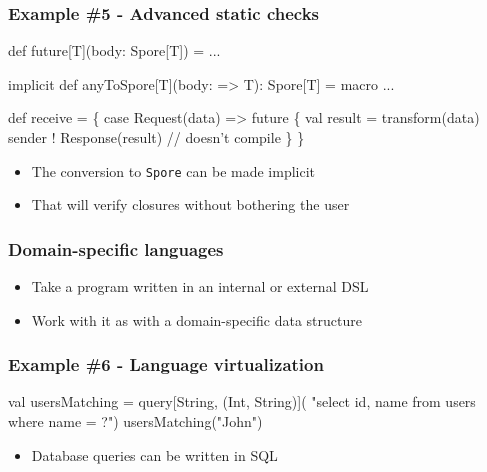 \documentclass[svgnames,hyperref={bookmarks=false}]{beamer}
\begin{document}
\begin{frame}[fragile, t]
\frametitle{Example \#5 - Advanced static checks}

\begin{semiverbatim}
def future[T](body: Spore[T]) = ...

\alert{implicit def anyToSpore[T](body: => T): Spore[T] = macro ...}

def receive = \{
  case Request(data) =>
    future \alert{\{}
      val result = transform(data)
      sender ! Response(result) \alert{// doesn't compile}
    \alert{\}}
\}

\end{semiverbatim}

\begin{itemize}
\item The conversion to \texttt{Spore} can be made implicit
\item That will verify closures without bothering the user
\end{itemize}
\end{frame}

\begin{frame}[fragile]
\frametitle{}

\vskip40pt
\begin{center}
\end{center}
\end{frame}

\begin{frame}[fragile]
\frametitle{Domain-specific languages}

\begin{itemize}
\item Take a program written in an internal or external DSL
\item Work with it as with a domain-specific data structure
\end{itemize}
\end{frame}

\begin{frame}[fragile, t]
\frametitle{Example \#6 - Language virtualization}

\begin{semiverbatim}
val usersMatching = query[String, (Int, String)](
  "select id, name from users where name = ?")
usersMatching("John")



\end{semiverbatim}

\begin{itemize}
\item Database queries can be written in SQL
\end{itemize}
\end{frame}
\end{document}
